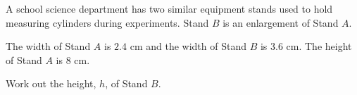 \begin{question}
\noindent A school science department has two similar equipment stands used to hold measuring cylinders during experiments. Stand $B$ is an enlargement of Stand $A$.

\begin{center}
\end{center}

\noindent The width of Stand $A$ is $2.4$ cm and the width of Stand $B$ is $3.6$ cm.
The height of Stand $A$ is $8$ cm.

Work out the height, $h$, of Stand $B$.

\vspace{4cm}
\begin{flushright}
\end{flushright}
\end{question}
